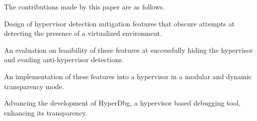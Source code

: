 The contributions made by this paper are as follows.

\case{}
Design of hypervisor detection mitigation features that obscure attempts at detecting the presence of a virtualized environment.

\case{}
An evaluation on feasibility of these features at successfully hiding the hypervisor and evading anti-hypervisor detections.

\case{}
An implementation of these features into a hypervisor in a modular and dynamic transparency mode.

\case{}
Advancing the development of HyperDbg, a hypervisor based debugging tool, enhancing its transparency.


